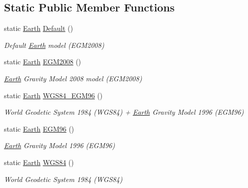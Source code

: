 \subsection*{Static Public Member Functions}
\begin{DoxyCompactItemize}
\item 
static \hyperlink{classostk_1_1physics_1_1env_1_1obj_1_1celest_1_1_earth}{Earth} \hyperlink{classostk_1_1physics_1_1env_1_1obj_1_1celest_1_1_earth_ab23224bee36577e7ab40576384ba8f2e}{Default} ()
\begin{DoxyCompactList}\small\item\em Default \hyperlink{classostk_1_1physics_1_1env_1_1obj_1_1celest_1_1_earth}{Earth} model (E\+G\+M2008) \end{DoxyCompactList}\item 
static \hyperlink{classostk_1_1physics_1_1env_1_1obj_1_1celest_1_1_earth}{Earth} \hyperlink{classostk_1_1physics_1_1env_1_1obj_1_1celest_1_1_earth_a69213489a7ce28c3dfa990283657b2bf}{E\+G\+M2008} ()
\begin{DoxyCompactList}\small\item\em \hyperlink{classostk_1_1physics_1_1env_1_1obj_1_1celest_1_1_earth}{Earth} Gravity Model 2008 model (E\+G\+M2008) \end{DoxyCompactList}\item 
static \hyperlink{classostk_1_1physics_1_1env_1_1obj_1_1celest_1_1_earth}{Earth} \hyperlink{classostk_1_1physics_1_1env_1_1obj_1_1celest_1_1_earth_a2c2af2af178d0eb24391a1ab19baa36a}{W\+G\+S84\+\_\+\+E\+G\+M96} ()
\begin{DoxyCompactList}\small\item\em World Geodetic System 1984 (W\+G\+S84) + \hyperlink{classostk_1_1physics_1_1env_1_1obj_1_1celest_1_1_earth}{Earth} Gravity Model 1996 (E\+G\+M96) \end{DoxyCompactList}\item 
static \hyperlink{classostk_1_1physics_1_1env_1_1obj_1_1celest_1_1_earth}{Earth} \hyperlink{classostk_1_1physics_1_1env_1_1obj_1_1celest_1_1_earth_ae86930600e872b2af40da227454fe49f}{E\+G\+M96} ()
\begin{DoxyCompactList}\small\item\em \hyperlink{classostk_1_1physics_1_1env_1_1obj_1_1celest_1_1_earth}{Earth} Gravity Model 1996 (E\+G\+M96) \end{DoxyCompactList}\item 
static \hyperlink{classostk_1_1physics_1_1env_1_1obj_1_1celest_1_1_earth}{Earth} \hyperlink{classostk_1_1physics_1_1env_1_1obj_1_1celest_1_1_earth_ad2c89b180e92bdc6c525ce7c065400aa}{W\+G\+S84} ()
\begin{DoxyCompactList}\small\item\em World Geodetic System 1984 (W\+G\+S84) \end{DoxyCompactList}\end{DoxyCompactItemize}

